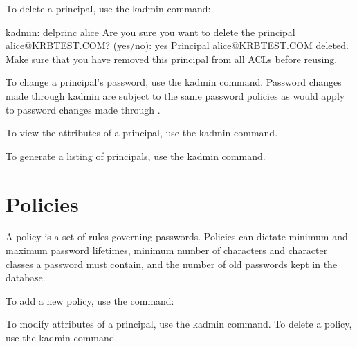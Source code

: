 \documentclass[letterpaper,10pt,english]{sphinxmanual}
\begin{document}
\sphinxAtStartPar
To delete a principal, use the kadmin  command:

\begin{sphinxVerbatim}[commandchars=\\\{\}]
kadmin: delprinc alice
Are you sure you want to delete the principal \PYGZdq{}alice@KRBTEST.COM\PYGZdq{}? (yes/no): yes
Principal \PYGZdq{}alice@KRBTEST.COM\PYGZdq{} deleted.
Make sure that you have removed this principal from all ACLs before reusing.
\end{sphinxVerbatim}

\sphinxAtStartPar
To change a principal’s password, use the kadmin 
command.  Password changes made through kadmin are subject to the same
password policies as would apply to password changes made through
.

\sphinxAtStartPar
To view the attributes of a principal, use the kadmin\textasciigrave{}
 command.

\sphinxAtStartPar
To generate a listing of principals, use the kadmin
 command.


\section{Policies}
\label{\detokenize{admin/database:policies}}\label{\detokenize{admin/database:id2}}
\sphinxAtStartPar
A policy is a set of rules governing passwords.  Policies can dictate
minimum and maximum password lifetimes, minimum number of characters
and character classes a password must contain, and the number of old
passwords kept in the database.

\sphinxAtStartPar
To add a new policy, use the {\hyperref[\detokenize{admin/admin_commands/kadmin_local:kadmin-1}]{}}  command:

\begin{sphinxVerbatim}[commandchars=\\\{\}]
      
\end{sphinxVerbatim}

\sphinxAtStartPar
To modify attributes of a principal, use the kadmin 
command.  To delete a policy, use the kadmin 
command.
\end{document}
